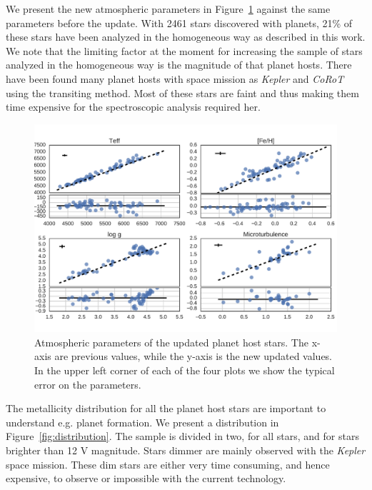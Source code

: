 \documentclass{aa}
\begin{document}
We present the new atmospheric parameters in Figure~\ref{fig:update} against the
same parameters before the update. With 2461 stars discovered with planets, 21\%
of these stars have been analyzed in the homogeneous way as described in this
work. We note that the limiting factor at the moment for increasing the sample
of stars analyzed in the homogeneous way is the magnitude of that planet hosts.
There have been found many planet hosts with space mission as \emph{Kepler} and
\emph{CoRoT} using the transiting method. Most of these stars are faint and thus
making them time expensive for the spectroscopic analysis required her.

\begin{figure}[tpb]
    \centering
    \includegraphics[width=1.0\linewidth]{figures/update.pdf}
    \caption{Atmospheric parameters of the updated planet host stars. The x-axis
    are previous values, while the y-axis is the new updated values. In the
    upper left corner of each of the four plots we show the typical error
    on the parameters.}
    \label{fig:update}
\end{figure}

The metallicity distribution for all the planet host stars are important to
understand e.g. planet formation. We present a distribution in
Figure~\ref{fig:distribution}. The sample is divided in two, for all stars, and
for stars brighter than 12 V magnitude. Stars dimmer are mainly observed with
the \emph{Kepler} space mission. These dim stars are either very time consuming,
and hence expensive, to observe or impossible with the current technology.
\end{document}
